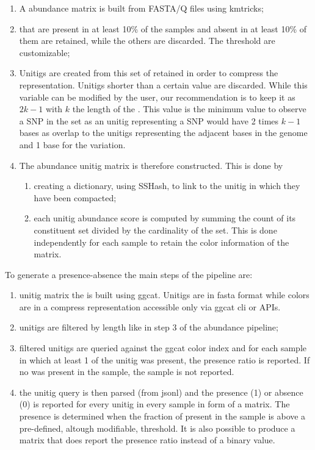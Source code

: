 \begin{enumerate}
	\item A \kmer abundance matrix is built from FASTA/Q files using kmtricks;
	\item \kmers that are present in at least 10\% of the samples and absent in at least 10\% of them are retained, while the others are discarded. The threshold are customizable;
	\item Unitigs are created from this set of retained \kmers in order to compress the representation. Unitigs shorter than a certain value are discarded. While this variable can be modified by the user, our recommendation is to keep it as $2k-1$ with $k$ the length of the \kmer. This value is the minimum value to observe a SNP in the set as an unitig representing a SNP would have 2 times $k-1$ bases as overlap to the unitigs representing the adjacent bases in the genome and 1 base for the variation.
	\item The abundance unitig matrix is therefore constructed. This is done by 
	\begin{enumerate}
		\item creating a dictionary, using SSHash, to link \kmers to the unitig in which they have been compacted;
		\item each unitig abundance score is computed by summing the count of its constituent \kmer set divided by the cardinality of the set. This is done independently for each sample to retain the color information of the \kmer matrix.
	\end{enumerate} 
\end{enumerate}
To generate a presence-absence the main steps of the pipeline are:
\begin{enumerate}
	\item unitig matrix the \ccdbg is built using ggcat. Unitigs are in fasta format while colors are in a compress representation accessible only via ggcat cli or APIs.
	\item unitigs are filtered by length like in step 3 of the abundance pipeline;
	\item filtered unitigs are queried against the ggcat color index and for each sample in which at least 1 \kmer of the unitig was present, the presence ratio is reported. If no \kmer was present in the sample, the sample is not reported.
	\item the unitig query is then parsed (from jsonl) and the presence (1) or absence (0) is reported for every unitig in every sample in form of a matrix. The presence is determined when the fraction of present \kmers in the sample is above a pre-defined, altough modifiable, threshold. It is also possible to produce a matrix that does report the presence ratio instead of a binary value.
\end{enumerate}
